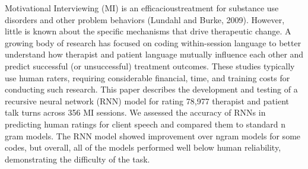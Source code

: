 Motivational Interviewing (MI) is an efficacioustreatment for substance use disorders and other problem behaviors (Lundahl and Burke, 2009). However, little is known about the specific mechanisms that drive therapeutic change. A growing body of research has focused on coding within-session language to better understand how therapist and patient language mutually influence each other and predict successful (or unsuccessful) treatment outcomes. These studies typically use human raters, requiring considerable financial, time, and training costs for conducting such research. This paper describes the development and testing of a recursive neural network (RNN) model for rating 78,977 therapist and patient talk turns across 356 MI sessions. We assessed the accuracy of RNNs in predicting human ratings for client speech and compared them to standard n gram models. The RNN model showed improvement over ngram models for some codes, but overall, all of the models performed well below human reliability, demonstrating the difficulty of the task.
